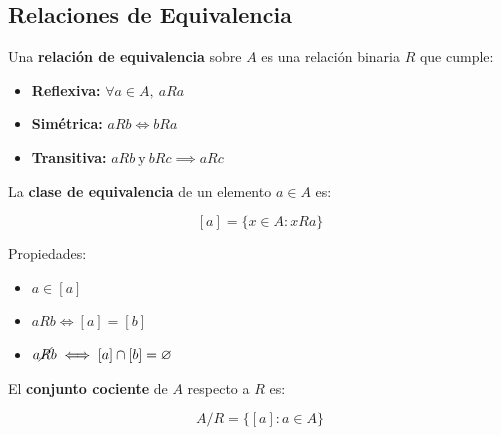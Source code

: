 \documentclass[a4paper,12pt]{article}
\begin{document}
\subsection{Relaciones de Equivalencia}

\begin{procedimiento}[title=Definición de Relación de Equivalencia]
Una \textbf{relación de equivalencia} sobre \(A\) es una relación binaria \(R\) que cumple:  

\begin{itemize}
    \item \textbf{Reflexiva:} \(\forall a \in A, \ aRa\)
    \item \textbf{Simétrica:} \(aRb \iff bRa\)
    \item \textbf{Transitiva:} \(aRb \ \text{y} \ bRc \implies aRc\)
\end{itemize}
\end{procedimiento}

\begin{procedimiento}[title=Clase de Equivalencia]
La \textbf{clase de equivalencia} de un elemento \(a \in A\) es:

\[
[a] = \{ x \in A : xRa \}
\]

Propiedades:  
\begin{itemize}
    \item \(a \in [a]\)
    \item \(aRb \iff [a] = [b]\)
    \item \(a \cancel{R} b \iff [a] \cap [b] = \varnothing\)
\end{itemize}
\end{procedimiento}

\begin{procedimiento}[title=Conjunto Cociente]
El \textbf{conjunto cociente} de \(A\) respecto a \(R\) es:

\[
A/R = \{ [a] : a \in A \}
\]
\end{procedimiento}
\end{document}
